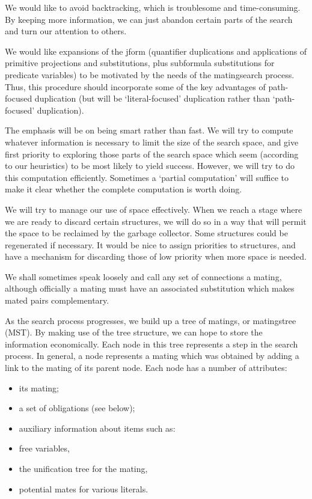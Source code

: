 	We would like to avoid backtracking, which is troublesome and
time-consuming. By keeping more information, we can just abandon certain
parts of the search and turn our attention to others.

	We would like expansions of the jform (quantifier duplications
and applications of primitive projections and substitutions, plus
subformula substitutions for predicate variables) to be motivated by
the needs of the matingsearch process. Thus, this procedure should
incorporate some of the key advantages of path-focused duplication
(but will be `literal-focused' duplication rather than `path-focused'
duplication).

	The emphasis will be on being smart rather than fast. We will
try to compute whatever information is necessary to limit the size of
the search space, and give first priority to exploring those parts of
the search space which seem (according to our heuristics) to be most
likely to yield success. However, we will try to do this computation
efficiently. Sometimes a `partial computation' will suffice to make it
clear whether the complete computation is worth doing.

	We will try to manage our use of space effectively. When we
reach a stage where we are ready to discard certain structures, we
will do so in a way that will permit the space to be reclaimed by the
garbage collector. Some structures could be regenerated if necessary.
It would be nice to assign priorities to structures, and have a
mechanism for discarding those of low priority when more space is
needed.


	We shall sometimes speak loosely and call any set of connections
a mating, although officially a mating must have an associated
substitution which makes mated pairs complementary.

	As the search process progresses, we build up a tree of
matings, or matingstree (MST). By making use of the tree structure, we
can hope to store the information economically.  Each node in this
tree represents a step in the search process. In general, a node
represents a mating which was obtained by adding a link to the mating
of its parent node.  Each node has a number of attributes:
\begin{itemize}
\item its mating;

\item a set of obligations (see below);

\item auxiliary information about items such as:

\item free variables,

\item the unification tree for the mating,

\item potential mates for various literals.
\end{itemize}

